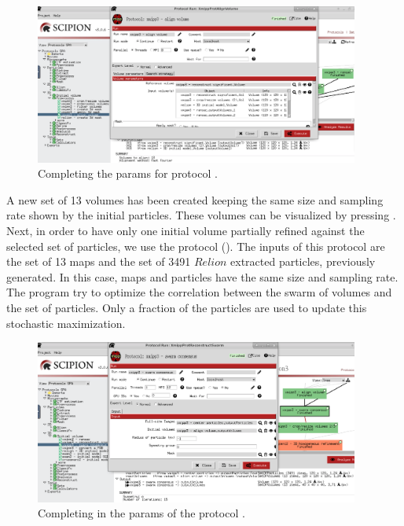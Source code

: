 \begin{figure}[H]
  \centering
  \captionsetup{width=.8\linewidth} 
  \includegraphics[width=0.95\textwidth]
  {images/8f_xmipp3_AlignVol.pdf}
  \caption{Completing the params for protocol .}
  \label{fig:align_volume}
  \end{figure}
  
A new set of 13 volumes has been created keeping the same size and sampling rate shown by the initial particles. These volumes can be visualized by pressing .\\

Next, in order to have only one initial volume partially refined against the selected set of particles, we use the protocol  (). The inputs of this protocol are the set of 13 maps and the set of 3491 $Relion$ extracted particles, previously generated. In this case, maps and particles have the same size and sampling rate. The program try to optimize the correlation between the swarm of volumes and the set of particles. Only a fraction of the particles are used to update this stochastic maximization.

\begin{figure}[H]
  \centering
  \captionsetup{width=.8\linewidth} 
  \includegraphics[width=0.95\textwidth]
  {images/8g_xmipp3_swarnconsensus.pdf}
  \caption{Completing in the params of the protocol .}
  \label{fig:swarn_consensus}
  \end{figure}
  
